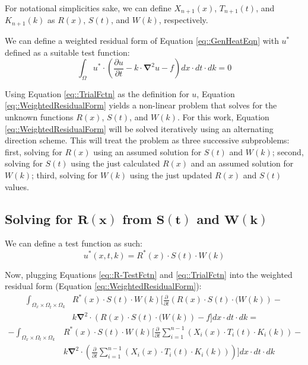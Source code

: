 \documentclass{article}
\def\ds{\displaystyle}
\def\pd{\partial}
\def\grad{\mathbf\nabla}
\begin{document}
For notational simplicities sake, we can define $X_{n+1}(x)$, $T_{n+1}(t)$, and $K_{n+1}(k)$ as $R(x)$, $S(t)$, and $W(k)$, respectively.

We can define a weighted residual form of Equation \ref{eq::GenHeatEqn} with $u^*$ defined as a suitable test function:
\begin{equation}
\label{eq::WeightedResidualForm}
\ds\int_{\Omega} u^* \cdot\left(\frac{\pd u}{\pd t} -k\cdot\grad^2 u -f \right) dx \cdot dt \cdot dk = 0
\end{equation}

Using Equation \ref{eq::TrialFctn} as the definition for $u$, Equation \ref{eq::WeightedResidualForm} yields a non-linear problem that solves for the unknown functions $R(x)$, $S(t)$, and $W(k)$. For this work, Equation \ref{eq::WeightedResidualForm} will be solved iteratively using an alternating direction scheme. This will treat the problem as three successive subproblems: first, solving for $R(x)$ using an assumed solution for $S(t)$ and $W(k)$; second, solving for $S(t)$ using the just calculated $R(x)$ and an assumed solution for $W(k)$; third, solving for $W(k)$ using the just updated $R(x)$ and $S(t)$ values.

\subsection{Solving for $\mathbf{R(x)}$ from $\mathbf{S(t)}$ and $\mathbf{W(k)}$}
We can define a test function as such:
\begin{equation}
\label{eq::R-TestFctn}
u^*(x,t,k) = R^*(x) \cdot S(t) \cdot W(k)
\end{equation}

Now, plugging Equations \ref{eq::R-TestFctn} and \ref{eq::TrialFctn} into the weighted residual form (Equation \ref{eq::WeightedResidualForm}):
\begin{align*}
\ds\int_{\Omega_x \times \Omega_t \times \Omega_k} & R^*(x) \cdot S(t) \cdot W(k) \bigg[ \frac{\pd}{\pd t} \left( R(x) \cdot S(t) \cdot (W(k) \right) - \\
&  k\grad^2 \cdot \left( R(x) \cdot S(t) \cdot (W(k) \right) -f \bigg] dx \cdot dt \cdot dk =
\end{align*}
\begin{align}
\label{eq::R-1}
- \ds\int_{\Omega_x \times \Omega_t \times \Omega_k} & R^*(x) \cdot S(t) \cdot W(k) \Bigg[\frac{\pd}{\pd t} \ds\sum_{i=1}^{n-1} \left(X_i(x) \cdot T_i(t) \cdot K_i(k)\right) - \nonumber\\
&  k\grad^2 \cdot \left( \frac{\pd}{\pd t} \ds\sum_{i=1}^{n-1} \left(X_i(x) \cdot T_i(t) \cdot K_i(k)\right) \right)\Bigg] dx \cdot dt \cdot dk
\end{align}
\end{document}
